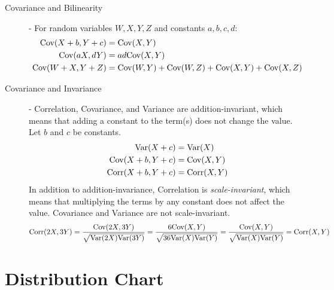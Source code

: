 \documentclass[11pt]{article}
\theoremstyle{definition}
\theoremstyle{remark}
\newcommand{\cov}{\textnormal{Cov}}
\newcommand{\corr}{\textnormal{Corr}}
\renewcommand{\var}{\textnormal{Var}}
\begin{document}
\begin{description}
\item [Covariance and Bilinearity] - For random variables $W, X, Y, Z$ and constants $a, b, c, d$:
	\begin{align*}
		\cov(X + b, Y + c) &= \cov(X, Y) \\
		\cov(aX, dY) &= ad\cov(X, Y) \\
		\cov(W + X, Y + Z) &= \cov(W, Y) + \cov(W, Z) + \cov(X, Y) + \cov(X, Z)
	\end{align*}
\item [Covariance and Invariance] - Correlation, Covariance, and Variance are addition-invariant, which means that adding a constant to the term(s) does not change the value. Let $b$ and $c$ be constants.
	\begin{align*}
		\var(X + c) &= \var(X) \\
		\cov(X + b, Y + c) &= \cov(X, Y) \\
		\corr(X + b, Y + c) &= \corr(X, Y) 
	\end{align*}
	In addition to addition-invariance, Correlation is \emph{scale-invariant}, which means that multiplying the terms by any constant does not affect the value. Covariance and Variance are not scale-invariant.
	\[\corr(2X, 3Y) = \frac{\cov(2X, 3Y)}{\sqrt{\var(2X)\var(3Y)}} = \frac{6\cov(X, Y)}{\sqrt{36\var(X)\var(Y)}} = \frac{\cov(X, Y)}{\sqrt{\var(X)\var(Y)}} = \corr(X, Y)\]
\end{description}


\section{Distribution Chart}
\end{document}
